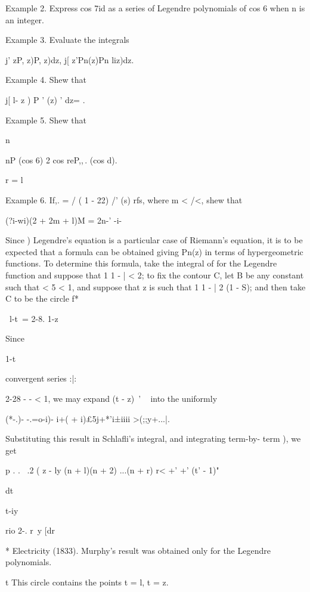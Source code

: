 {{Example 2. Express cos 7id as a series of Legendre polynomials of cos
6 when n is an integer.

Example 3. Evaluate the integrals

j' zP, z)P, z)dz, j[ z'Pn(z)Pn liz)dz.

Example 4. Shew that

j[ l- z ) P ' (z) ' dz= . 

Example 5. Shew that

n

nP (cos 6) 2 cos reP,,\,. (cos d).

r = l

Example 6. If,. = / ( 1 - 22) /' (s) rfs, where m < /<, shew that

(?i-wi)(2 + 2m + l)M = 2n-' -i- 


Since ) Legendre's equation is a particular case of Riemann's
equation, it is to be expected that a formula can be obtained giving
Pn(z) in terms of hypergeometric functions. To determine this formula,
take the integral of for the Legendre function and suppose that
1 1 - | < 2; to fix the contour C, let B be any constant such that <
5 < 1, and suppose that z is such that 1 1 - | 2 (1 - S); and then
take C to be the circle f*

\ l-t\ = 2-8. 1-z

Since

1-t

convergent series :|:

2-28 - - < 1, we may expand (t - z)~' ~ into the uniformly

(*-.)- -.=o-i)- i+( + i)£5j+*'i±iiii >(;;y+...|.

Substituting this result in Schlafli's integral, and integrating
term-by- term ), we get

p . . \ .2 ( z - ly (n + l)(n + 2) ...(n + r) r< +' +' (t' - 1)"

dt

 t-iy

rio 2-. r\ y [dr

* Electricity (1833). Murphy's result was obtained only for the
Legendre polynomials.

t This circle contains the points t = l, t = z.

}}
